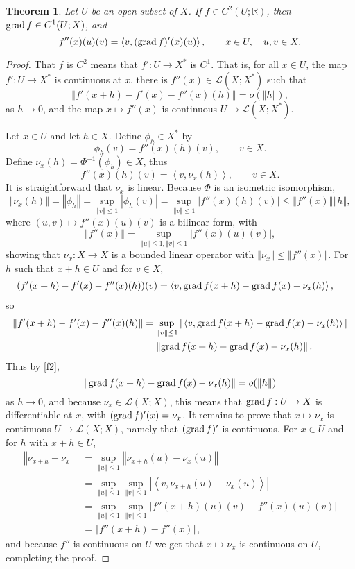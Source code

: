 \documentclass{article}
\newcommand{\inner}[2]{\left\langle #1, #2 \right\rangle}
\newcommand{\grad}{\ensuremath\mathrm{grad}\,}
\newcommand{\norm}[1]{\left\Vert #1 \right\Vert}
\newtheorem{theorem}{Theorem}
\theoremstyle{definition}
\begin{document}
\begin{theorem}
Let $U$ be an open subset of $X$. If $f \in C^2(U;\mathbb{R})$, then $\grad  f \in C^1(U;X)$, and
\begin{equation}
f''(x)(u)(v) = \inner{v}{(\grad f)'(x)(u)},\qquad x \in U, \quad u,v \in X.
\label{hessian}
\end{equation}
\end{theorem}
\begin{proof}
That $f$ is $C^2$ means that $f':U \to X^*$ is $C^1$. That is, for all $x \in U$, 
the map $f':U \to X^*$ is continuous at $x$, there is 
$f''(x) \in \mathscr{L}(X;X^*)$ such that
\begin{equation}
\norm{f'(x+h)-f'(x)-f''(x)(h)} = o(\norm{h}),
\label{f2}
\end{equation}
as $h \to 0$, and the map $x \mapsto f''(x)$ is continuous 
$U \to \mathscr{L}(X;X^*)$. 

Let $x \in U$ and let $h \in X$.
Define $\phi_h \in X^*$ by
\[
\phi_h(v) = f''(x)(h)(v), \qquad v \in X.
\]
Define $\nu_x(h) = \Phi^{-1}(\phi_h) \in X$,
thus
\[
f''(x)(h)(v) = \inner{v}{\nu_x(h)}, \qquad v \in X.
\]
It is straightforward that $\nu_x$ is linear. Because $\Phi$ is an isometric isomorphism,
\[
\norm{\nu_x(h)}=\norm{\phi_h}
=\sup_{\norm{v} \leq 1} |\phi_h(v)|
=\sup_{\norm{v} \leq 1} |f''(x)(h)(v)|
\leq \norm{f''(x)} \norm{h},
\]
where $(u,v) \mapsto f''(x)(u)(v)$ is a bilinear form, with
\[
\norm{f''(x)} = \sup_{\norm{u} \leq 1, \norm{v} \leq 1} |f''(x)(u)(v)|,
\]
showing that $\nu_x:X \to X$ is a bounded linear operator with $\norm{\nu_x} \leq \norm{f''(x)}$. 
For $h$ such that $x+h \in U$ and for $v \in X$,
\begin{align*}
(f'(x+h)-f'(x)-f''(x)(h))(v)&=\inner{v}{\grad f(x+h) - \grad f(x)-\nu_x(h)},
\end{align*}
so
\begin{align*}
\norm{f'(x+h)-f'(x)-f''(x)(h)}&=\sup_{\norm{v} \leq 1} 
|\inner{v}{\grad f(x+h) - \grad f(x)-\nu_x(h)}|\\
&= \norm{\grad f(x+h)-\grad f(x) - \nu_x(h)}.
\end{align*}
Thus by \eqref{f2}, 
\[
\norm{\grad f(x+h)-\grad f(x) - \nu_x(h)}=o(\norm{h})
\]
as $h \to 0$, and because $\nu_x \in \mathscr{L}(X;X)$, this means that
$\grad f:U \to X$ is differentiable at $x$, with
$(\grad f)'(x) = \nu_x$. 
It remains to prove that $x \mapsto \nu_x$ is continuous
$U \to \mathscr{L}(X;X)$, namely that $(\grad f)'$ is continuous. 
For $x \in U$ and for $h$ with $x+h \in U$,
\begin{align*}
\norm{\nu_{x+h}-\nu_x} &= \sup_{\norm{u} \leq 1} \norm{\nu_{x+h}(u)-\nu_x(u)}\\
&=\sup_{\norm{u} \leq 1} \sup_{\norm{v} \leq 1} |\inner{v}{\nu_{x+h}(u)-\nu_x(u)}|\\
&=\sup_{\norm{u} \leq 1} \sup_{\norm{v} \leq 1} |f''(x+h)(u)(v)-f''(x)(u)(v)|\\
&=\norm{f''(x+h)-f''(x)},
\end{align*}
and because $f''$ is continuous on $U$ we get that $x \mapsto \nu_x$ is continuous on $U$, completing
the proof.
\end{proof}
\end{document}
